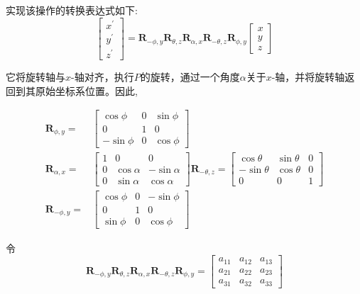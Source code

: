 实现该操作的转换表达式如下:
$$
\left[\begin{array}{c}
x^{\prime} \\
y^{\prime} \\
z^{\prime}
\end{array}\right]=\mathbf{R}_{-\phi, y} \mathbf{R}_{\theta, z} \mathbf{R}_{\alpha, x} \mathbf{R}_{-\theta, z} \mathbf{R}_{\phi, y}\left[\begin{array}{c}
x \\
y \\
z
\end{array}\right]
$$

它将旋转轴与$x$-轴对齐，执行$P$的旋转，通过一个角度$\alpha$关于$x$-轴，并将旋转轴返回到其原始坐标系位置。因此,

$$
\begin{aligned}
\mathbf{R}_{\phi, y}= & {\left[\begin{array}{ccc}
\cos \phi & 0 & \sin \phi \\
0 & 1 & 0 \\
-\sin \phi & 0 & \cos \phi
\end{array}\right] } \\
\mathbf{R}_{\alpha, x}= & {\left[\begin{array}{ccc}
1 & 0 & 0 \\
0 & \cos \alpha & -\sin \alpha \\
0 & \sin \alpha & \cos \alpha
\end{array}\right] \mathbf{R}_{-\theta, z}=\left[\begin{array}{ccc}
\cos \theta & \sin \theta & 0 \\
-\sin \theta & \cos \theta & 0 \\
0 & 0 & 1
\end{array}\right] } \\
\mathbf{R}_{-\phi, y}= & {\left[\begin{array}{ccc}
\cos \phi & 0 & -\sin \phi \\
0 & 1 & 0 \\
\sin \phi & 0 & \cos \phi
\end{array}\right] }
\end{aligned}
$$

令
$$
\mathbf{R}_{-\phi, y} \mathbf{R}_{\theta, z} \mathbf{R}_{\alpha, x} \mathbf{R}_{-\theta, z} \mathbf{R}_{\phi, y}=\left[\begin{array}{lll}
a_{11} & a_{12} & a_{13} \\
a_{21} & a_{22} & a_{23} \\
a_{31} & a_{32} & a_{33}
\end{array}\right]
$$

